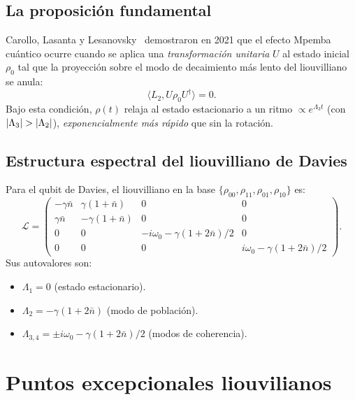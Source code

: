 \subsection{La proposición fundamental}

Carollo, Lasanta y Lesanovsky~\cite{carollo2021} demostraron en 2021 que el 
efecto Mpemba cuántico ocurre cuando se aplica una \emph{transformación 
unitaria} $U$ al estado inicial $\rho_{0}$ tal que la proyección sobre el 
modo de decaimiento más lento del liouvilliano se anula:
\begin{equation}
    \langle L_2, U \rho_0 U^{\dagger} \rangle = 0.
    \label{eq:quantum_sME}
\end{equation}
%
Bajo esta condición, $\rho(t)$ relaja al estado estacionario a un ritmo 
$\propto e^{\Lambda_{3} t}$ (con $\abs{\Lambda_{3}} > \abs{\Lambda_{2}}$), 
\emph{exponencialmente más rápido} que sin la rotación.

\subsection{Estructura espectral del liouvilliano de Davies}

Para el qubit de Davies, el liouvilliano en la base 
$\{\rho_{00}, \rho_{11}, \rho_{01}, \rho_{10}\}$ es:
\begin{equation}
    \mathcal{L} = \begin{pmatrix}
        -\gamma \bar{n} & \gamma(1+\bar{n}) & 0 & 0 \\
        \gamma \bar{n} & -\gamma(1+\bar{n}) & 0 & 0 \\
        0 & 0 & -i\omega_0 - \gamma(1+2\bar{n})/2 & 0 \\
        0 & 0 & 0 & i\omega_0 - \gamma(1+2\bar{n})/2
    \end{pmatrix}.
\end{equation}
%
Sus autovalores son:
\begin{itemize}
\item $\Lambda_1 = 0$ (estado estacionario).
\item $\Lambda_2 = -\gamma(1+2\bar{n})$ (modo de población).
\item $\Lambda_{3,4} = \pm i\omega_0 - \gamma(1+2\bar{n})/2$ (modos de coherencia).
\end{itemize}

\section{Puntos excepcionales liouvilianos}

